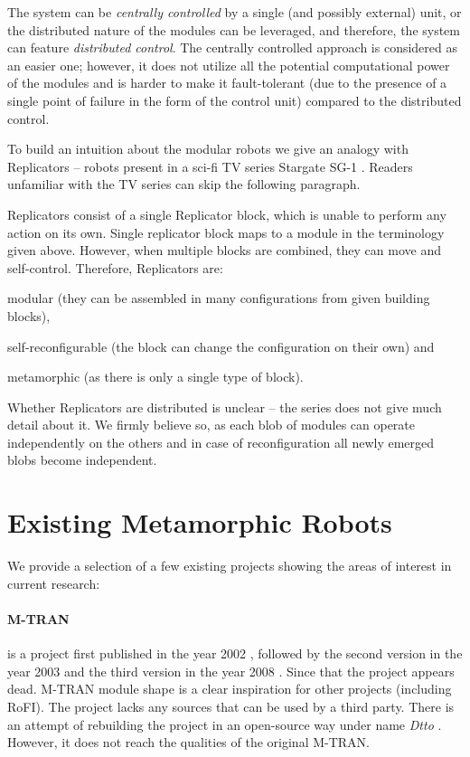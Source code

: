 The system can be \emph{centrally controlled} by a single (and possibly
external) unit, or the distributed nature of the modules can be leveraged, and
therefore, the system can feature \emph{distributed control}. The centrally
controlled approach is considered as an easier one; however, it does not utilize
all the potential computational power of the modules and is harder to make it
fault-tolerant (due to the presence of a single point of failure in the form of
the control unit) compared to the distributed control.

To build an intuition about the modular robots we give an analogy with
Replicators -- robots present in a sci-fi TV series Stargate
SG-1 \cite{wright_stargate_1997}. Readers unfamiliar with the TV series can skip
the following paragraph.

Replicators consist of a single Replicator block, which is unable to perform any
action on its own. Single replicator block maps to a module in the terminology
given above. However, when multiple blocks are combined, they can move and
self-control. Therefore, Replicators are:
\begin{enumerate*}
    \item modular (they can be assembled in many configurations from given
    building blocks),
    \item self-reconfigurable (the block can change the configuration on their
    own) and
    \item metamorphic (as there is only a single type of block).
\end{enumerate*}
Whether Replicators are distributed is unclear -- the series does not give much
detail about it. We firmly believe so, as each blob of modules can operate
independently on the others and in case of reconfiguration all newly emerged
blobs become independent.

\section{Existing Metamorphic Robots}

We provide a selection of a few existing projects showing the areas of interest
in current research:

\paragraph{M-TRAN} is a project first published in the year 2002
\cite{murata_m-tran:_2002}, followed by the second version in the year 2003
\cite{haruhisa_kurokawa_m-tran_2003} and the third version in the year 2008
\cite{kurokawa_distributed_2008}. Since that the project appears dead. M-TRAN
module shape is a clear inspiration for other projects (including RoFI). The
project lacks any sources that can be used by a third party. There is an attempt
of rebuilding the project in an open-source way under name \emph{Dtto}
\cite{noauthor_dtto_nodate}. However, it does not reach the qualities of the
original M-TRAN.

